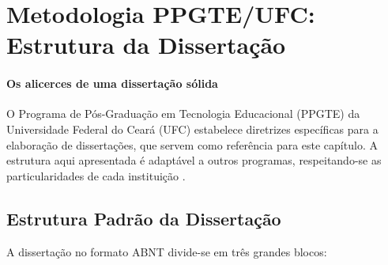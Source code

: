 \section{Metodologia PPGTE/UFC: Estrutura da Dissertação}
\label{sec:metodologia-ppgte-ufc}
\nivelavancado

\paragraph{Os alicerces de uma dissertação sólida} O Programa de Pós-Graduação em Tecnologia Educacional (PPGTE) da Universidade
Federal do Ceará (UFC) estabelece diretrizes específicas para a elaboração de
dissertações, que servem como referência para este capítulo. A estrutura aqui
apresentada é adaptável a outros programas, respeitando-se as particularidades
de cada instituição \cite{abnt2023nbr14724}.

\subsection{Estrutura Padrão da Dissertação}

A dissertação no formato ABNT divide-se em três grandes blocos:

